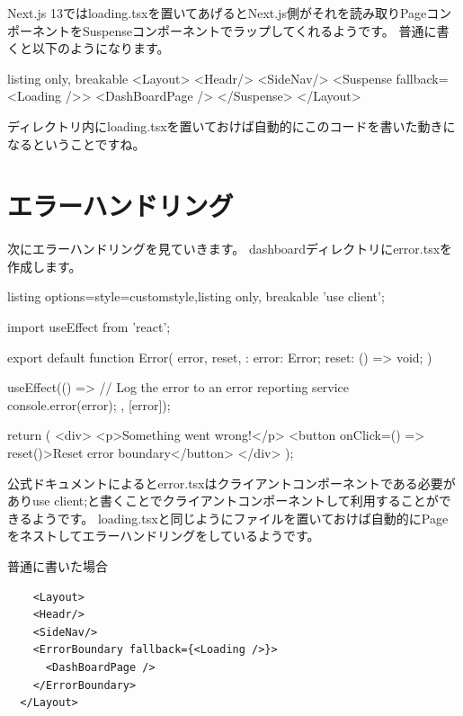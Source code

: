Next.js 13ではloading.tsxを置いてあげるとNext.js側がそれを読み取りPageコンポーネントをSuspenseコンポーネントでラップしてくれるようです。
普通に書くと以下のようになります。



\begin{tcblisting}{listing only, breakable}
  <Layout>
  <Headr/>
  <SideNav/>
  <Suspense fallback={<Loading />}>
  <DashBoardPage />
  </Suspense>
  </Layout>
\end{tcblisting}


ディレクトリ内にloading.tsxを置いておけば自動的にこのコードを書いた動きになるということですね。


\section{エラーハンドリング}

次にエラーハンドリングを見ていきます。
dashboardディレクトリにerror.tsxを作成します。


\begin{tcblisting}{listing options={style=customstyle},listing only, breakable}
  'use client';

  import { useEffect } from 'react';

  export default function Error({
      error,
      reset,
    }: {
  error: Error;
  reset: () => void;
  }) {
  useEffect(() => {
  // Log the error to an error reporting service
  console.error(error);
  }, [error]);

  return (
  <div>
  <p>Something went wrong!</p>
  <button onClick={() => reset()}>Reset error boundary</button>
  </div>
  );
  }
\end{tcblisting}



公式ドキュメントによるとerror.tsxはクライアントコンポーネントである必要がありuse client;と書くことでクライアントコンポーネントして利用することができるようです。
loading.tsxと同じようにファイルを置いておけば自動的にPageをネストしてエラーハンドリングをしているようです。

普通に書いた場合



\begin{tcolorbox}[breakable]
  \begin{verbatim}
    <Layout>
    <Headr/>
    <SideNav/>
    <ErrorBoundary fallback={<Loading />}>
      <DashBoardPage />
    </ErrorBoundary>
  </Layout>
  \end{verbatim}
\end{tcolorbox}


